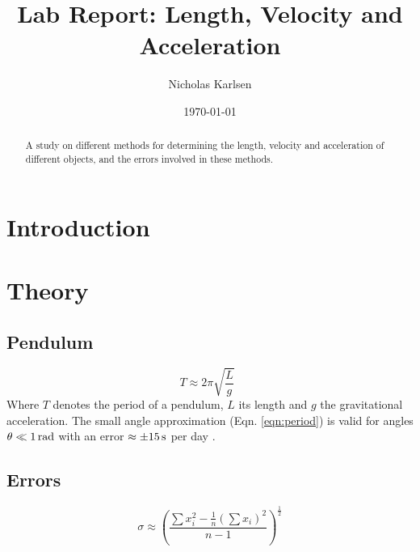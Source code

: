\documentclass[%
 reprint,
 amsmath,amssymb,
 aps,
]{revtex4-1}
\begin{document}

\title{Lab Report: Length, Velocity and Acceleration}%

\author{Nicholas Karlsen}

\date{\today}%

\begin{abstract}
  A study on different methods for determining the length, velocity and acceleration of different objects, and the errors involved in these methods.
\end{abstract}

\maketitle


\section{\label{sec:intro}Introduction}

\section{\label{sec:theory}Theory}
  \subsection{Pendulum}
    \begin{equation}
      \label{eqn:period}
        T \approx 2\pi \sqrt{\frac{L}{g}}\enspace
    \end{equation}
    Where $T$ denotes the period of a pendulum, $L$ its length and $g$ the gravitational acceleration. The small angle approximation (Eqn. \ref{eqn:period})  is valid for angles $\theta \ll 1\, \textup{rad}$ with an error $\approx \pm 15 \, \textup{s}$ per day \cite{pend_wik}.
  \subsection{Errors}
    \begin{equation}
    \label{eqn:sigma}
      \sigma \approx \left(
      \frac{\sum x_i^2 - \frac{1}{n}(\sum x_i)^2}
      {n - 1}
      \right)^\frac{1}{2}
    \end{equation}
    
\end{document}
